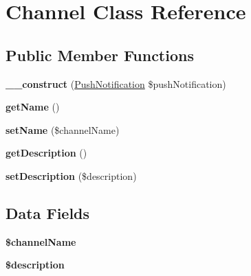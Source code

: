 \hypertarget{class_channel}{\section{Channel Class Reference}
\label{class_channel}
}
\subsection*{Public Member Functions}
\begin{DoxyCompactItemize}
\item 
\hypertarget{class_channel_abcc39cb65004478bb4a40bd4689f845b}{{\bfseries \+\_\+\+\_\+construct} (\hyperlink{class_push_notification}{Push\+Notification} \$push\+Notification)}\label{class_channel_abcc39cb65004478bb4a40bd4689f845b}

\item 
\hypertarget{class_channel_a3d0963e68bb313b163a73f2803c64600}{{\bfseries get\+Name} ()}\label{class_channel_a3d0963e68bb313b163a73f2803c64600}

\item 
\hypertarget{class_channel_a2584371ce1d71fbf121f96ae4a72483e}{{\bfseries set\+Name} (\$channel\+Name)}\label{class_channel_a2584371ce1d71fbf121f96ae4a72483e}

\item 
\hypertarget{class_channel_a2e7bb35c71bf1824456ceb944cb7a845}{{\bfseries get\+Description} ()}\label{class_channel_a2e7bb35c71bf1824456ceb944cb7a845}

\item 
\hypertarget{class_channel_a31fad3e39336ea079ea758e051866627}{{\bfseries set\+Description} (\$description)}\label{class_channel_a31fad3e39336ea079ea758e051866627}

\end{DoxyCompactItemize}
\subsection*{Data Fields}
\begin{DoxyCompactItemize}
\item 
\hypertarget{class_channel_a1799a40e565a7ce020d9adca384900d6}{{\bfseries \$channel\+Name}}\label{class_channel_a1799a40e565a7ce020d9adca384900d6}

\item 
\hypertarget{class_channel_a87b032cba06009e3467abf1c8018d960}{{\bfseries \$description}}\label{class_channel_a87b032cba06009e3467abf1c8018d960}

\end{DoxyCompactItemize}
